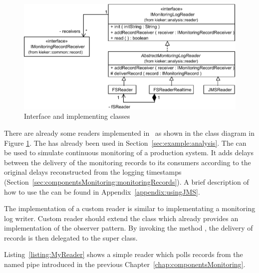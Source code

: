 \begin{figure}\centering
\includegraphics[scale=0.7]{images/kieker_readerimplsuserguide-modified}
\caption{Interface  and implementing classes}
\label{Figure:ReaderHierarchy}
\end{figure}
% 
% 

\enlargethispage{1cm}

\noindent There are already some readers implemented in \Kieker\  as shown in the %
class diagram in Figure \ref{Figure:ReaderHierarchy}. %
The  has already been used in Section~\ref{sec:example:analysis}. %
The  can be used to simulate continuous monitoring of a %
production system. It adds delays between the delivery of the monitoring records %
to its consumers according to the original delays reconstructed from the logging %
timestamps (Section~\ref{sec:componentsMonitoring:monitoringRecords}).
A brief description of how to use the  can be found in Appendix~\ref{appendix:usingJMS}. %

\noindent The implementation of a custom reader is similar to implementating a %
monitoring log writer. Custom reader should extend the class  %
which already provides an implementation of the observer pattern. %
By invoking the method ,  the delivery of records is then %
delegated to the super class.

Listing~\ref{listing:MyReader} shows a simple reader which polls records from %
the named pipe introduced in the previous Chapter~\ref{chap:componentsMonitoring}. %


